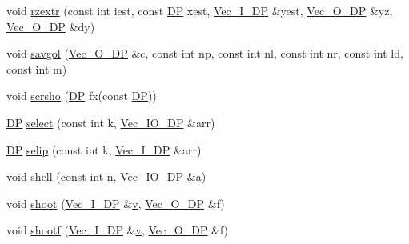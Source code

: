 \begin{DoxyCompactItemize}
\item 
void \mbox{\hyperlink{namespaceNR_a17af9084521630603977a8c9bd46bd40}{rzextr}} (const int iest, const \mbox{\hyperlink{namespaceNR_af6ff762dd605ff477b8e52387253a02a}{DP}} xest, \mbox{\hyperlink{namespaceNR_a9f943da53862537c552e2a770cb170ae}{Vec\+\_\+\+I\+\_\+\+DP}} \&yest, \mbox{\hyperlink{namespaceNR_a970094d23441f8ef6a45282a7eb2103d}{Vec\+\_\+\+O\+\_\+\+DP}} \&yz, \mbox{\hyperlink{namespaceNR_a970094d23441f8ef6a45282a7eb2103d}{Vec\+\_\+\+O\+\_\+\+DP}} \&dy)
\item 
void \mbox{\hyperlink{namespaceNR_a8c8d71cc60561155b11e42e028ee3b8c}{savgol}} (\mbox{\hyperlink{namespaceNR_a970094d23441f8ef6a45282a7eb2103d}{Vec\+\_\+\+O\+\_\+\+DP}} \&c, const int np, const int nl, const int nr, const int ld, const int m)
\item 
void \mbox{\hyperlink{namespaceNR_adc488f409f614650e59bd201350349ee}{scrsho}} (\mbox{\hyperlink{namespaceNR_af6ff762dd605ff477b8e52387253a02a}{DP}} fx(const \mbox{\hyperlink{namespaceNR_af6ff762dd605ff477b8e52387253a02a}{DP}}))
\item 
\mbox{\hyperlink{namespaceNR_af6ff762dd605ff477b8e52387253a02a}{DP}} \mbox{\hyperlink{namespaceNR_a0717290c06f42aa15e83108843ebe8e9}{select}} (const int k, \mbox{\hyperlink{namespaceNR_ab293e06a6bf799d8a7ed932b6852bcb8}{Vec\+\_\+\+I\+O\+\_\+\+DP}} \&arr)
\item 
\mbox{\hyperlink{namespaceNR_af6ff762dd605ff477b8e52387253a02a}{DP}} \mbox{\hyperlink{namespaceNR_a9c893dc4317a41c90e5275f875f49514}{selip}} (const int k, \mbox{\hyperlink{namespaceNR_a9f943da53862537c552e2a770cb170ae}{Vec\+\_\+\+I\+\_\+\+DP}} \&arr)
\item 
void \mbox{\hyperlink{namespaceNR_a64047fe43a54a8a00d0311739cf7d0d2}{shell}} (const int n, \mbox{\hyperlink{namespaceNR_ab293e06a6bf799d8a7ed932b6852bcb8}{Vec\+\_\+\+I\+O\+\_\+\+DP}} \&a)
\item 
void \mbox{\hyperlink{namespaceNR_a3a4867f05151e5dd8b231be47dbd5523}{shoot}} (\mbox{\hyperlink{namespaceNR_a9f943da53862537c552e2a770cb170ae}{Vec\+\_\+\+I\+\_\+\+DP}} \&\mbox{\hyperlink{adat__devel_2lib_2hadron_2hadron__timeslice_8cc_a716fc87f5e814be3ceee2405ed6ff22a}{v}}, \mbox{\hyperlink{namespaceNR_a970094d23441f8ef6a45282a7eb2103d}{Vec\+\_\+\+O\+\_\+\+DP}} \&f)
\item 
void \mbox{\hyperlink{namespaceNR_a377b3f789f3b63d3472b288e5ee103cd}{shootf}} (\mbox{\hyperlink{namespaceNR_a9f943da53862537c552e2a770cb170ae}{Vec\+\_\+\+I\+\_\+\+DP}} \&\mbox{\hyperlink{adat__devel_2lib_2hadron_2hadron__timeslice_8cc_a716fc87f5e814be3ceee2405ed6ff22a}{v}}, \mbox{\hyperlink{namespaceNR_a970094d23441f8ef6a45282a7eb2103d}{Vec\+\_\+\+O\+\_\+\+DP}} \&f)

\end{DoxyCompactItemize}
